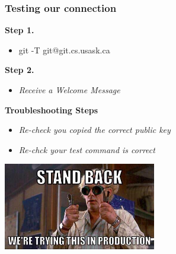 \documentclass{beamer}
\begin{document}
\begin{frame}
	\frametitle{\textbf{Testing our connection}}

	\begin{multicols}{2}
	\textbf{Step 1.}
	\begin{itemize}
		\item git -T git@git.cs.usask.ca 
	\end{itemize}

	\vspace{0.5cm}
	\textbf{Step 2.}
	\begin{itemize}
		\item \textit{Receive a Welcome Message}
	\end{itemize}

	\vspace{0.9cm}
	\begin{block}{\textbf{Troubleshooting Steps}}
		\begin{itemize}
			\item \textit{Re-check you copied the correct public key}
			\item \textit{Re-chck your test command is correct}
		\end{itemize}
	\end{block}
	
			\includegraphics[width=0.5\textwidth]{img/standback.jpeg}
	\end{multicols}
\end{frame}
\end{document}
